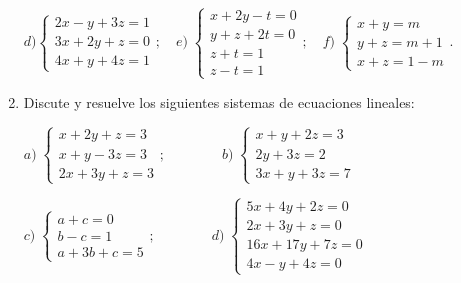 \begin{enumerate}
\noindent \hspace{-5mm} \small{$d) \begin{cases}  2x-y+3z=1\\3x+2y+z=0\\4x+y+4z=1  \end{cases}; \quad e)\; \begin{cases} x+2y-t=0\\y+z+2t=0\\z+t=1\\z-t=1   \end{cases}; \quad f)\; \begin{cases} x+y=m\\y+z=m+1\\x+z=1-m   \end{cases}$}\normalsize{.}

\vspace{2mm}





\item Discute y resuelve los siguientes sistemas de ecuaciones lineales:

$a)\; \begin{cases} x+2y+z=3\\x+y-3z=3\\2x+3y+z=3   \end{cases}; \qquad \qquad b)\;\begin{cases} x+y+2z=3\\2y+3z=2\\3x+y+3z=7   \end{cases}$ 

$c)\; \begin{cases}  a+c=0\\b-c=1\\a+3b+c=5  \end{cases}; \qquad \qquad d)\;\begin{cases}    5x+4y+2z=0\\2x+3y+z=0\\16x+17y+7z=0\\4x-y+4z=0 \end{cases}$ 


\end{enumerate}
